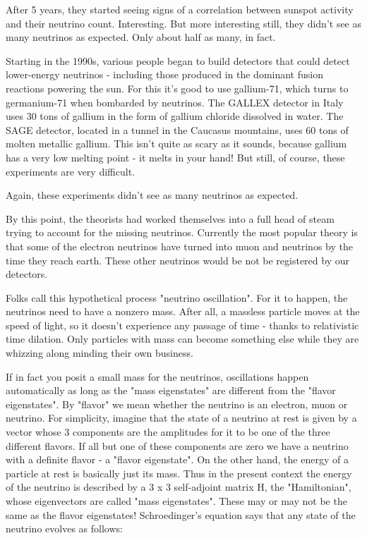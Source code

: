 After 5 years, they started seeing signs of a correlation between
sunspot activity and their neutrino count.  Interesting.  But more
interesting still, they didn't see as many neutrinos as expected.  
Only about half as many, in fact.  

Starting in the 1990s, various people began to build detectors that
could detect lower-energy neutrinos - including those produced in the 
dominant fusion reactions powering the sun.   For this it's good to use
gallium-71, which turns to germanium-71 when bombarded by neutrinos. 
The GALLEX detector in Italy uses 30 tons of gallium in the form of
gallium chloride dissolved in water.  The SAGE detector, located in a
tunnel in the Caucasus mountains, uses 60 tons of molten metallic
gallium.   This isn't quite as scary as it sounds, because gallium has a
very low melting point - it melts in your hand!  But still, of course,
these experiments are very difficult.  

Again, these experiments didn't see as many neutrinos as expected.

By this point, the theorists had worked themselves into a full head of
steam trying to account for the missing neutrinos.  Currently the most
popular theory is that some of the electron neutrinos have turned into
muon and \tau  neutrinos by the time they reach earth.  These other 
neutrinos would be not be registered by our detectors.  

Folks call this hypothetical process "neutrino oscillation".  For it
to happen, the neutrinos need to have a nonzero mass.  After all,
a massless particle moves at the speed of light, so it doesn't experience
any passage of time - thanks to relativistic time dilation.  Only particles
with mass can become something else while they are whizzing along minding
their own business.  

If in fact you posit a small mass for the neutrinos, oscillations happen
automatically as long as the "mass eigenstates" are different 
from the
"flavor eigenstates".  By "flavor" we mean whether 
the neutrino is an
electron, muon or \tau  neutrino.  For simplicity, imagine that the state 
of a neutrino at rest is given by a vector whose 3 components are the 
amplitudes for it to be one of the three different flavors.  If all 
but one of these components are zero we have a neutrino with a definite
flavor - a "flavor eigenstate".   On the other hand, the energy of a
particle at rest is basically just its mass.  Thus in the present
context the energy of the neutrino is described by a 3 x 3 self-adjoint
matrix H, the "Hamiltonian", whose eigenvectors are called "mass
eigenstates".  These may or may not be the same as the flavor
eigenstates!  Schroedinger's equation says that any state \psi  of the
neutrino evolves as follows:

